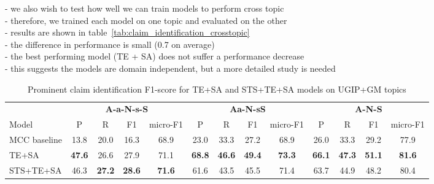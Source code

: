 - we also wish to test how well we can train models to perform cross topic \\
- therefore, we trained each model on one topic and evaluated on the other \\
- results are shown in table~\ref{tab:claim_identification_crosstopic} \\
- the difference in performance is small (0.7 on average) \\
- the best performing model (TE + SA) does not suffer a performance decrease \\
- this suggests the models are domain independent, but a more detailed study is needed \\

\begin{table}
\setlength{\tabcolsep}{5pt}
\centering
{\small
\begin{tabular}{l cccc cccc cccc}
\toprule
& \multicolumn{4}{c}{\textbf{A-a-N-s-S}} & \multicolumn{4}{c}{\textbf{Aa-N-sS}} & 
\multicolumn{4}{c}{\textbf{A-N-S}}\\
\cmidrule(lr){2-5}
\cmidrule(lr){6-9}
\cmidrule(lr){10-13}
Model
& P & R & F1 & micro-F1 & P & R & F1 & micro-F1 & P & R & F1 & micro-F1 \\
\midrule
MCC baseline & 13.8 & 20.0 & 16.3 & 68.9 & 23.0 & 33.3 & 27.2 & 68.9 & 26.0 & 33.3 & 29.2 & 77.9\\
TE+SA & \textbf{47.6} & 26.6 & 27.9 & 71.1 & \textbf{68.8} & \textbf{46.6} & \textbf{49.4} & \textbf{73.3} & \textbf{66.1} & \textbf{47.3} & \textbf{51.1} & \textbf{81.6} \\
STS+TE+SA & 46.3 & \textbf{27.2} & \textbf{28.6} & \textbf{71.6} & 61.6 & 43.5 & 45.5 & 71.4  & 63.7 & 44.9 & 48.2 & 80.4 \\
\bottomrule
\end{tabular}}
\caption{Prominent claim identification F1-score for TE+SA and STS+TE+SA models on UGIP+GM topics}
\label{tab:claim_identification_best}
\end{table}

